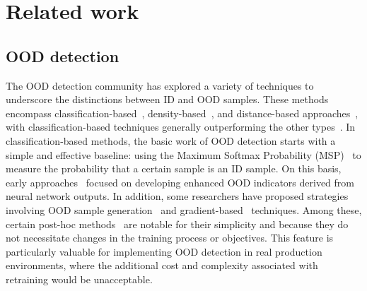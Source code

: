\section{Related work}

\subsection{OOD detection}
The OOD detection community has explored a variety of techniques to underscore the distinctions between ID and OOD samples. These methods encompass classification-based~\cite{huang2021mos_confi,liang2018odin_confi,bendale2016towards_confi,devries2018learning_confi,hendrycks2016baseline_confi, sastry2020gram, tack2020csi, du2022vos}, density-based~\cite{zong2018deep_densi,abati2019latent_densi,nalisnick2018deep_densi,zisselman2020deep_densi,jiang2021revisiting_densi,pidhorskyi2018generative_densi,kirichenko2020normalizing_densi,sabokrou2018adversarially_densi}, and distance-based approaches~\cite{sun2022out_dist,lee2018maha_dist,ming2022cider_dist,chen2020boundary_dist,zaeemzadeh2021out_dist,van2020uncertainty_dist,techapanurak2020hyperparameter_dist,lu2023uncertainty_dist, sun2022knn}, with classification-based techniques generally outperforming the other types~\cite{yang2021generalized_survey}. In classification-based methods, the basic work of OOD detection starts with a simple and effective baseline: using the Maximum Softmax Probability (MSP)~\cite{hendrycks2016baseline_confi} to measure the probability that a certain sample is an ID sample.
On this basis, early approaches~\cite{liang2018odin_confi, hsu2020generalized, liu2020energy} focused on developing enhanced OOD indicators derived from neural network outputs. In addition, some researchers have proposed strategies involving OOD sample generation~\cite{lee2018training,du2022vos} and gradient-based~\cite{liang2018odin_confi} techniques. Among these, certain post-hoc methods~\cite{hendrycks2016msp, liang2018odin_confi,liu2020energy, sun2021react, sun2022dice, djurisic2022extremely, yu2023block,du2022vos} are notable for their simplicity and because they do not necessitate changes in the training process or objectives. This feature is particularly valuable for implementing OOD detection in real production environments, where the additional cost and complexity associated with retraining would be unacceptable.

